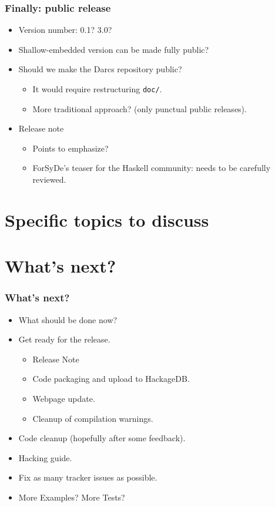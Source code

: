 \documentclass{beamer}
\begin{document}
\begin{frame}
  \frametitle{Finally: public release}
 \begin{itemize}
 \item Version number: 0.1? 3.0?
 \item Shallow-embedded version can be made fully public?
 \item Should we make the Darcs repository public?
   \begin{itemize}
   \item It would require restructuring \texttt{doc/}.
   \item More traditional approach? (only punctual public releases).
   \end{itemize}
 \item Release note
   \begin{itemize}
     \item Points to emphasize?
     \item ForSyDe's teaser for the Haskell community: needs to be
       carefully reviewed.
     \end{itemize}
 \end{itemize}
\end{frame}


\section{Specific topics to discuss}

\section{What's next?}

\begin{frame}
  \frametitle{What's next?}
 \begin{itemize}
 \item What should be done now? 
 \item Get ready for the release.
   \begin{itemize}
     \item Release Note
     \item Code packaging and upload to HackageDB.
     \item Webpage update.
     \item Cleanup of compilation warnings.
   \end{itemize}
 \item Code cleanup (hopefully after some feedback).
 \item Hacking guide.
 \item Fix as many tracker issues as possible.
 \item More Examples? More Tests?
 \end{itemize}
\end{frame}
\end{document}
